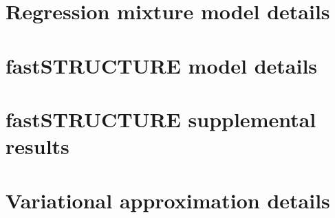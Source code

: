 \documentclass[11pt]{article}
\begin{document}
\section{Regression mixture model details}


\section{fastSTRUCTURE model details}


\section{fastSTRUCTURE supplemental results}


\section{Variational approximation details}
\end{document}
